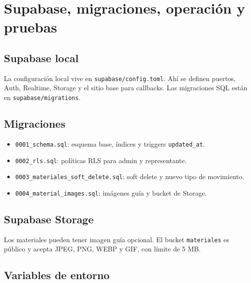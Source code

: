 \documentclass[12pt,a4paper,oneside]{report}
\newcommand{\file}[1]{\texttt{\color{cecyteDark}#1}}
\begin{document}
\chapter{Supabase, migraciones, operación y pruebas}

\section{Supabase local}

La configuración local vive en \file{supabase/config.toml}. Ahí se definen puertos, Auth, Realtime, Storage y el sitio base para callbacks. Las migraciones SQL están en \file{supabase/migrations}.

\section{Migraciones}

\begin{itemize}
  \item \file{0001\_schema.sql}: esquema base, índices y triggers \file{updated\_at}.
  \item \file{0002\_rls.sql}: políticas RLS para admin y representante.
  \item \file{0003\_materiales\_soft\_delete.sql}: soft delete y nuevo tipo de movimiento.
  \item \file{0004\_material\_images.sql}: imágenes guía y bucket de Storage.
\end{itemize}

\section{Supabase Storage}

Los materiales pueden tener imagen guía opcional. El bucket \file{materiales} es público y acepta JPEG, PNG, WEBP y GIF, con límite de 5 MB.

\section{Variables de entorno}
\end{document}
